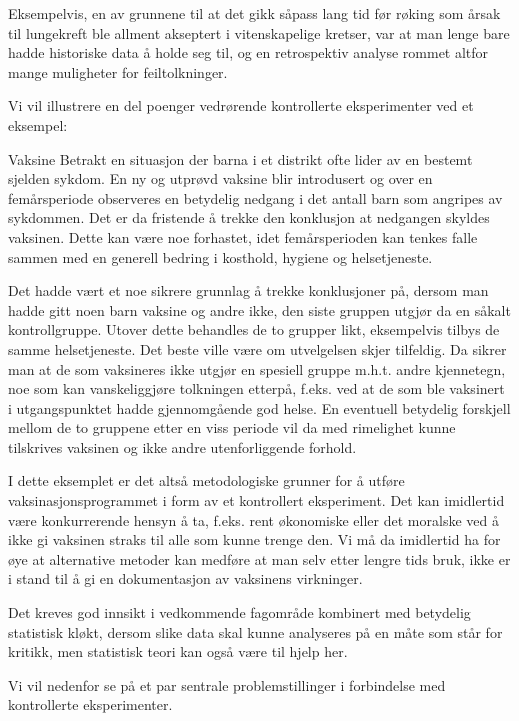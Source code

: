 Eksempelvis, en av grunnene til at det gikk såpass lang tid før
røking som årsak til lungekreft ble allment akseptert i 
vitenskapelige kretser, var at man lenge bare hadde historiske data å
holde seg til, og en retrospektiv analyse rommet altfor mange muligheter
for feiltolkninger.  

Vi vil illustrere en del poenger vedrørende kontrollerte eksperimenter
ved et eksempel:\\


\begin{eksempel}{Vaksine}
Betrakt en situasjon der barna i et distrikt ofte lider av en bestemt
sjelden sykdom.  En ny og utprøvd vaksine blir introdusert og over
en femårsperiode observeres en betydelig nedgang i det antall barn
som angripes av sykdommen.  Det er da fristende å trekke den 
konklusjon at nedgangen skyldes vaksinen.  Dette kan være noe 
forhastet, idet femårsperioden kan tenkes falle sammen med en generell
bedring i kosthold, hygiene og helsetjeneste. 

 Det hadde vært 
et noe sikrere grunnlag å trekke konklusjoner på, dersom man 
hadde gitt noen barn vaksine og andre ikke, den siste gruppen utgjør 
da en såkalt kontrollgruppe.  Utover dette behandles de to grupper 
likt, eksempelvis tilbys de samme helsetjeneste.  Det beste ville
være om utvelgelsen skjer tilfeldig.  Da sikrer man at de som 
vaksineres ikke utgjør en spesiell gruppe m.h.t. andre kjennetegn,
noe som kan vanskeliggjøre tolkningen etterpå, f.eks. ved at de
som ble vaksinert i utgangspunktet hadde gjennomgående god helse. 
En eventuell betydelig forskjell mellom de to gruppene etter en viss 
periode vil da med rimelighet kunne tilskrives vaksinen og ikke andre
utenforliggende forhold.

I dette eksemplet er det altså metodologiske grunner for å
utføre vaksinasjonsprogrammet i form av et kontrollert eksperiment.
Det kan imidlertid være konkurrerende hensyn å ta, f.eks. rent 
økonomiske eller det moralske ved å ikke gi vaksinen straks til
alle som kunne trenge den.  Vi må da imidlertid ha for øye at
alternative metoder kan medføre at man selv etter lengre tids bruk,
ikke er i stand til å gi en dokumentasjon av vaksinens virkninger.
\end{eksempel}
Det kreves god innsikt i vedkommende fagområde kombinert med
betydelig statistisk kløkt, dersom slike data skal kunne analyseres
på en måte som står for kritikk, men statistisk teori kan
også være til hjelp her.

Vi vil nedenfor se på et par sentrale problemstillinger i 
forbindelse med kontrollerte eksperimenter.


